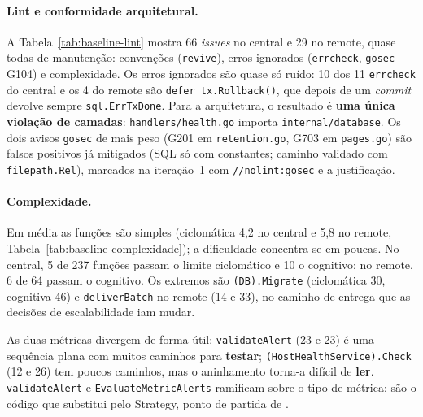 \paragraph{Lint e conformidade arquitetural.}
A Tabela~\ref{tab:baseline-lint} mostra 66 \emph{issues} no central e 29 no remote, quase todas de manutenção:
convenções (\texttt{revive}), erros ignorados (\texttt{errcheck}, \texttt{gosec} G104) e complexidade. Os erros
ignorados são quase só ruído: 10 dos 11 \texttt{errcheck} do central e os 4 do remote são \texttt{defer
tx.Rollback()}, que depois de um \emph{commit} devolve sempre \texttt{sql.ErrTxDone}. Para a arquitetura, o
resultado é \textbf{uma única violação de camadas}: \texttt{handlers/health.go} importa \texttt{internal/database}.
Os dois avisos \texttt{gosec} de mais peso (G201 em \texttt{retention.go}, G703 em \texttt{pages.go}) são falsos
positivos já mitigados (SQL só com constantes; caminho validado com \texttt{filepath.Rel}), marcados na iteração~1
com \texttt{//nolint:gosec} e a justificação.


\paragraph{Complexidade.}
Em média as funções são simples (ciclomática 4,2 no central e 5,8 no remote,
Tabela~\ref{tab:baseline-complexidade}); a dificuldade concentra-se em poucas. No central, 5 de 237 funções passam o
limite ciclomático e 10 o cognitivo; no remote, 6 de 64 passam o cognitivo. Os extremos são \texttt{(DB).Migrate}
(ciclomática 30, cognitiva 46) e \texttt{deliverBatch} no remote (14 e 33), no caminho de entrega que as decisões de
escalabilidade iam mudar.

As duas métricas divergem de forma útil: \texttt{validateAlert} (23 e 23) é uma sequência plana com muitos
caminhos para \textbf{testar}; \texttt{(HostHealthService).Check} (12 e 26) tem poucos caminhos, mas o aninhamento
torna-a difícil de \textbf{ler}. \texttt{validateAlert} e \texttt{EvaluateMetricAlerts} ramificam sobre o tipo de
métrica: são o código que  substitui pelo Strategy, ponto de partida de .


